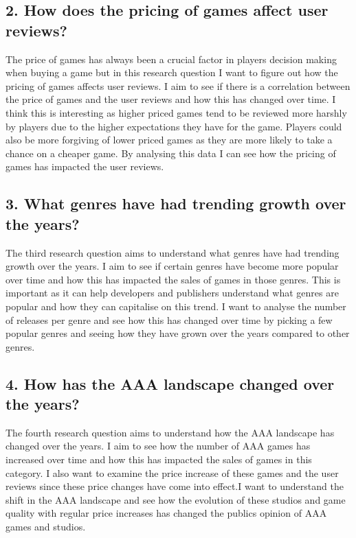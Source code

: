 \documentclass[
]{article}
\begin{document}
\subsection{2. How does the pricing of games affect user
reviews?}\label{how-does-the-pricing-of-games-affect-user-reviews}

The price of games has always been a crucial factor in players decision
making when buying a game but in this research question I want to figure
out how the pricing of games affects user reviews. I aim to see if there
is a correlation between the price of games and the user reviews and how
this has changed over time. I think this is interesting as higher priced
games tend to be reviewed more harshly by players due to the higher
expectations they have for the game. Players could also be more
forgiving of lower priced games as they are more likely to take a chance
on a cheaper game. By analysing this data I can see how the pricing of
games has impacted the user reviews.

\subsection{3. What genres have had trending growth over the
years?}\label{what-genres-have-had-trending-growth-over-the-years}

The third research question aims to understand what genres have had
trending growth over the years. I aim to see if certain genres have
become more popular over time and how this has impacted the sales of
games in those genres. This is important as it can help developers and
publishers understand what genres are popular and how they can
capitalise on this trend. I want to analyse the number of releases per
genre and see how this has changed over time by picking a few popular
genres and seeing how they have grown over the years compared to other
genres.

\subsection{4. How has the AAA landscape changed over the
years?}\label{how-has-the-aaa-landscape-changed-over-the-years}

The fourth research question aims to understand how the AAA landscape
has changed over the years. I aim to see how the number of AAA games has
increased over time and how this has impacted the sales of games in this
category. I also want to examine the price increase of these games and
the user reviews since these price changes have come into effect.I want
to understand the shift in the AAA landscape and see how the evolution
of these studios and game quality with regular price increases has
changed the publics opinion of AAA games and studios.
\end{document}
